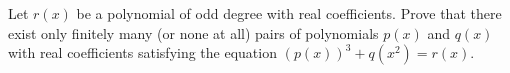 Let $r(x)$ be a polynomial of odd degree with real coefficients. Prove that there exist only finitely many (or none at all) pairs of polynomials $p(x) $ and $q(x)$ with real coefficients satisfying the equation $(p(x))^3 + q(x^2) = r(x)$.